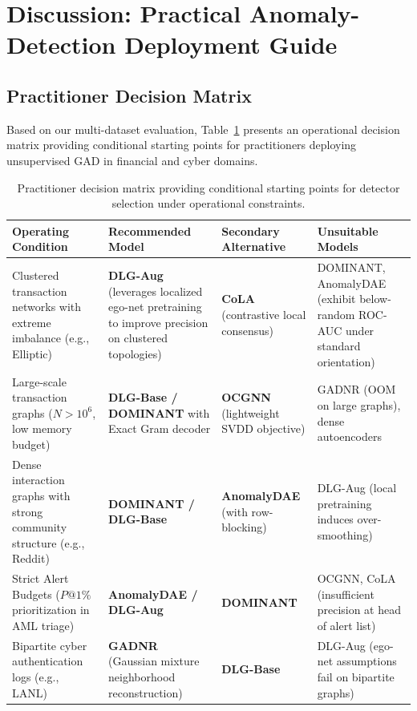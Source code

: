 \documentclass[applsci,article,submit,moreauthors,pdftex]{Definitions/mdpi}
\begin{document}
\section{Discussion: Practical Anomaly-Detection Deployment Guide}
\label{sec:discussion}

\subsection{Practitioner Decision Matrix}
Based on our multi-dataset evaluation, Table~\ref{tab:decision_matrix} presents an operational decision matrix providing conditional starting points for practitioners deploying unsupervised GAD in financial and cyber domains.

\begin{table}[htbp]
\centering\footnotesize\setlength{\tabcolsep}{4pt}
\caption{Practitioner decision matrix providing conditional starting points for detector selection under operational constraints.}
\label{tab:decision_matrix}
\begin{tabularx}{\textwidth}{>{\raggedright\arraybackslash}p{}>{\raggedright\arraybackslash}X>{\raggedright\arraybackslash}X>{\raggedright\arraybackslash}p{}}\toprule
\textbf{Operating Condition} & \textbf{Recommended Model} & \textbf{Secondary Alternative} & \textbf{Unsuitable Models} \\\midrule
Clustered transaction networks with extreme imbalance (e.g., Elliptic) & \textbf{DLG-Aug} (leverages localized ego-net pretraining to improve precision on clustered topologies) & \textbf{CoLA} (contrastive local consensus) & DOMINANT, AnomalyDAE (exhibit below-random ROC-AUC under standard orientation) \\
Large-scale transaction graphs ($N > 10^6$, low memory budget) & \textbf{DLG-Base / DOMINANT} with Exact Gram decoder & \textbf{OCGNN} (lightweight SVDD objective) & GADNR (OOM on large graphs), dense autoencoders \\
Dense interaction graphs with strong community structure (e.g., Reddit) & \textbf{DOMINANT / DLG-Base} & \textbf{AnomalyDAE} (with row-blocking) & DLG-Aug (local pretraining induces over-smoothing) \\
Strict Alert Budgets ($P@1\%$ prioritization in AML triage) & \textbf{AnomalyDAE / DLG-Aug} & \textbf{DOMINANT} & OCGNN, CoLA (insufficient precision at head of alert list) \\
Bipartite cyber authentication logs (e.g., LANL) & \textbf{GADNR} (Gaussian mixture neighborhood reconstruction) & \textbf{DLG-Base} & DLG-Aug (ego-net assumptions fail on bipartite graphs) \\\bottomrule
\end{tabularx}
\end{table}
\end{document}
